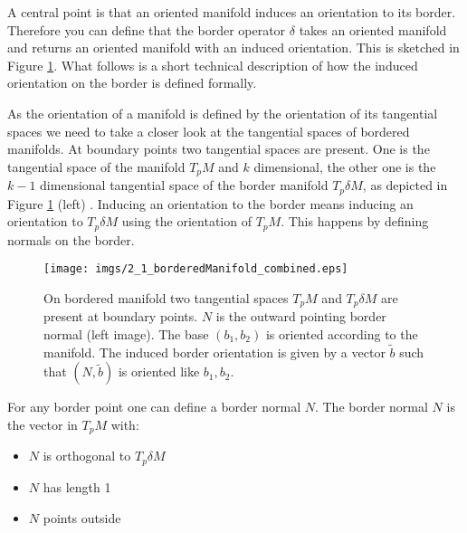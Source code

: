 A central point  is that an oriented manifold induces an orientation to its border. Therefore you can define that the border operator $\delta$ takes an oriented manifold and returns an oriented manifold with an induced orientation.  This is sketched in Figure \ref{fig::2_1_borderManifold}.  What follows is a short technical description of how the induced orientation on the border is defined formally. %

 As the orientation of a manifold is defined by the orientation of its tangential spaces we need to take a closer look at the tangential spaces of bordered manifolds.
At boundary points two tangential spaces are present. One is the tangential space of the manifold $T_pM$ and $k$ dimensional, the other one is the $k-1$ dimensional tangential space of the border manifold $T_p \delta M$, as depicted in Figure \ref{fig::2_1_borderManifold} (left) . Inducing an orientation to the border means inducing an orientation to $T_p\delta M$ using the orientation of $T_p M$. This happens by defining normals on the border.

\begin{figure}
\begin{center}
\texttt{[image: imgs/2\_1\_borderedManifold\_combined.eps]}
\end{center}
\caption{On bordered manifold two tangential spaces $T_pM$ and $T_p\delta M$  are present at boundary points. $N$ is the outward pointing border normal (left image). The base $(b_1,b_2)$ is oriented according to the manifold. The induced border orientation is given by a vector $\widetilde{b}$ such that  $(N, \widetilde{b})$ is oriented like $b_1,b_2$.}
\label{fig::2_1_borderManifold}
\end{figure}

For any border point one can define a border normal $N$. The border normal $N$ is the vector in $T_p M$ with:
\begin{itemize}
\item $N$ is orthogonal to $T_p \delta M$
\item $N$ has length 1
\item $N$ points outside
\end{itemize}

